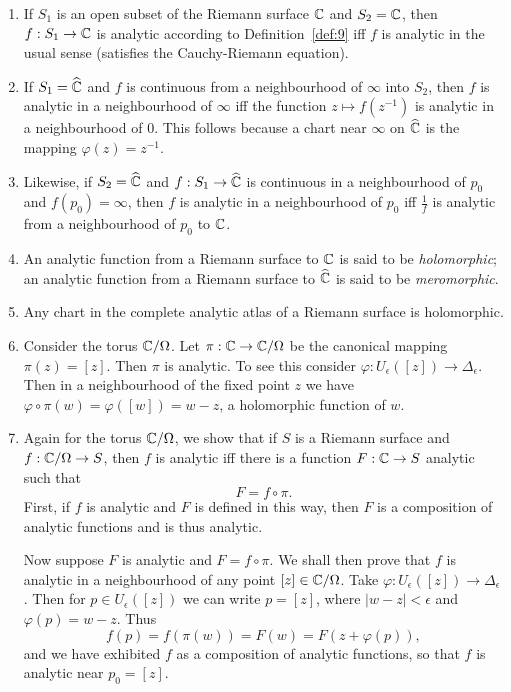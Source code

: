 \documentclass[a4paper,11pt]{article}
\begin{document}
\begin{exmp}
  \label{eg:22}
  \begin{enumerate}
  \item If $S_1$ is an open subset of the Riemann surface ${\mathbb C}$ and
    $S_2 = {\mathbb C}$, then $f : S_1 \to {\mathbb C}$ is analytic according to
    Definition~\ref{def:9} iff $f$ is analytic in the usual sense
    (satisfies the Cauchy-Riemann equation).
  \item If $S_1 = \widehat{{\mathbb C}}$ and $f$ is continuous from a
    neighbourhood of $\infty$ into $S_2$, then $f$ is analytic in a
    neighbourhood of $\infty$  iff the function $z \mapsto f(z^{-1})$ 
    is analytic in a neighbourhood of 0.  This follows because a chart
    near $\infty$ on $\widehat{{\mathbb C}}$ is the mapping $\varphi(z) =
    z^{-1}$.
  \item Likewise, if $S_2 = \widehat{{\mathbb C}}$ and $f : S_1 \to
    \widehat{{\mathbb C}}$ is continuous in a neighbourhood of $p_0$ and
    $f(p_0) = \infty$, then $f$ is analytic in a neighbourhood of
    $p_0$ iff $\frac{1}{f}$ is analytic from a neighbourhood of $p_0$
    to ${\mathbb C}$.

  \item An analytic function from a Riemann surface to ${\mathbb C}$ is said
    to be \emph{holomorphic}; an analytic function from a Riemann
    surface to $\widehat{{\mathbb C}}$ is said to be \emph{meromorphic}.
  \item Any chart in the complete analytic atlas of a Riemann surface
    is holomorphic.
  \item Consider the torus ${\mathbb C} / \Omega$.  Let $\pi : {\mathbb C} \to
    {\mathbb C}/\Omega$ be the canonical mapping $\pi(z) = [z]$.  Then $\pi$
    is analytic.  To see this consider $\varphi : U_\epsilon([z]) \to
    \Delta_\epsilon$.   Then in a neighbourhood of the fixed point $z$
    we have $\varphi \circ \pi(w) = \varphi([w]) = w-z$, a holomorphic
    function of $w$.
  \item Again for the torus ${\mathbb C}/\Omega$, we show that if $S$ is a
    Riemann surface and $f : {\mathbb C}/\Omega \to S$, then $f$ is analytic
    iff there is a function $F : {\mathbb C} \to S$ analytic such that
    $$
    F = f\circ \pi.
    $$
    First, if $f$ is analytic and $F$ is defined in this way, then $F$
    is a composition of analytic functions and is thus analytic.

    Now suppose $F$ is analytic and $F = f\circ \pi$.  We shall then
    prove that $f$ is analytic in a neighbourhood of any point $[z]
    \in {\mathbb C}/\Omega$.  Take $\varphi : U_\epsilon([z]) \to
    \Delta_\epsilon$.  Then for $p \in U_\epsilon([z])$ we can write
    $p = [z]$, where $|w-z| < \epsilon$ and $\varphi(p) = w-z$.  Thus
    $$
    f(p) = f(\pi(w)) = F(w) = F(z + \varphi(p)),
    $$
    and we have exhibited $f$ as a composition of analytic functions,
    so that $f$ is analytic near $p_0 = [z]$.


\end{enumerate}
\end{exmp}
\end{document}
